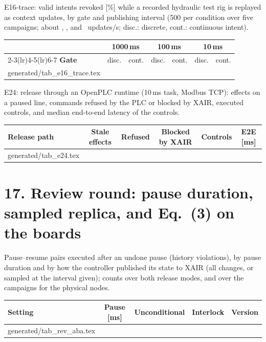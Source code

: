 \documentclass[11pt]{article}
\makeatletter
\newcommand{\gen}[1]{\@@input generated/#1.tex }
\makeatother
\begin{document}
\noindent E16-trace: valid intents revoked [\%] while a recorded hydraulic test rig is replayed as context updates, by gate and publishing interval (500 per condition over five campaigns; about \TraceRateA, \TraceRateB, and \TraceRateC\ updates/s; disc.: discrete, cont.: continuous intent).
\begin{center}\small\setlength{\tabcolsep}{4pt}
\begin{tabular}{@{}lcccccc@{}}
\toprule
& \multicolumn{2}{c}{\textbf{1000\,ms}} & \multicolumn{2}{c}{\textbf{100\,ms}} & \multicolumn{2}{c}{\textbf{10\,ms}} \\
\cmidrule(lr){2-3}\cmidrule(lr){4-5}\cmidrule(lr){6-7}
\textbf{Gate} & disc. & cont. & disc. & cont. & disc. & cont. \\
\midrule
\gen{tab_e16_trace}
\bottomrule
\end{tabular}
\end{center}

\noindent E24: release through an OpenPLC runtime (10\,ms task, Modbus TCP): effects on a paused line, commands refused by the PLC or blocked by XAIR, executed controls, and median end-to-end latency of the controls.
\begin{center}\footnotesize\setlength{\tabcolsep}{4pt}
\begin{tabular}{@{}lccccc@{}}
\toprule
\textbf{Release path} & \textbf{Stale effects} & \textbf{Refused} & \textbf{Blocked by XAIR} & \textbf{Controls} & \textbf{E2E [ms]} \\
\midrule
\gen{tab_e24}
\bottomrule
\end{tabular}
\end{center}


\section*{17. Review round: pause duration, sampled replica, and Eq.~(3) on the boards}
Pause--resume pairs executed after an undone pause (history violations), by pause duration and by how the controller published its state
to XAIR (all changes, or sampled at the interval given); counts over both release modes, and over the campaigns for the physical nodes.

\begin{center}\footnotesize\setlength{\tabcolsep}{3.5pt}
\begin{tabular}{@{}lcccc@{}}
\toprule
\textbf{Setting} & \textbf{Pause [ms]} & \textbf{Unconditional} & \textbf{Interlock} & \textbf{Version} \\
\midrule
\gen{tab_rev_aba}
\bottomrule
\end{tabular}\end{center}
\end{document}
